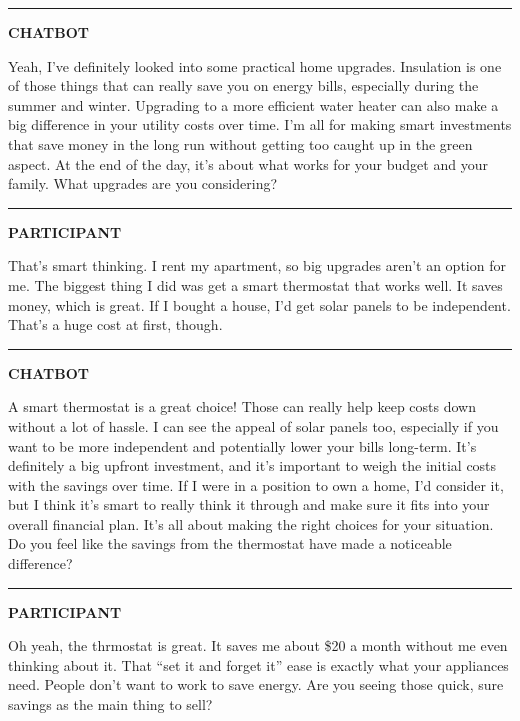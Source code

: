 \documentclass[
  11pt,
  oneside]{article}
\begin{document}
\begin{center}\rule{0.5\linewidth}{0.5pt}\end{center}

\textbf{CHATBOT}

Yeah, I've definitely looked into some practical home upgrades.
Insulation is one of those things that can really save you on energy
bills, especially during the summer and winter. Upgrading to a more
efficient water heater can also make a big difference in your utility
costs over time. I'm all for making smart investments that save money in
the long run without getting too caught up in the green aspect. At the
end of the day, it's about what works for your budget and your family.
What upgrades are you considering?

\begin{center}\rule{0.5\linewidth}{0.5pt}\end{center}

\textbf{PARTICIPANT}

That's smart thinking. I rent my apartment, so big upgrades aren't an
option for me. The biggest thing I did was get a smart thermostat that
works well. It saves money, which is great. If I bought a house, I'd get
solar panels to be independent. That's a huge cost at first, though.

\begin{center}\rule{0.5\linewidth}{0.5pt}\end{center}

\textbf{CHATBOT}

A smart thermostat is a great choice! Those can really help keep costs
down without a lot of hassle. I can see the appeal of solar panels too,
especially if you want to be more independent and potentially lower your
bills long-term. It's definitely a big upfront investment, and it's
important to weigh the initial costs with the savings over time. If I
were in a position to own a home, I'd consider it, but I think it's
smart to really think it through and make sure it fits into your overall
financial plan. It's all about making the right choices for your
situation. Do you feel like the savings from the thermostat have made a
noticeable difference?

\begin{center}\rule{0.5\linewidth}{0.5pt}\end{center}

\textbf{PARTICIPANT}

Oh yeah, the thrmostat is great. It saves me about \$20 a month without
me even thinking about it. That ``set it and forget it'' ease is exactly
what your appliances need. People don't want to work to save energy. Are
you seeing those quick, sure savings as the main thing to sell?
\end{document}
